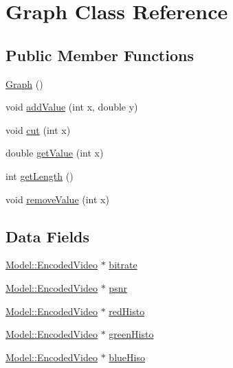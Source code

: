 \hypertarget{classModel_1_1Graph}{}\section{Graph Class Reference}
\label{classModel_1_1Graph}
\subsection*{Public Member Functions}
\begin{DoxyCompactItemize}
\item 
\hyperlink{classModel_1_1Graph_afc5ef9d72cc2c509814200791eaef62c}{Graph} ()
\item 
void \hyperlink{classModel_1_1Graph_ad4f64ac7b49c53bcfe6e62f538381a50}{add\+Value} (int x, double y)
\item 
void \hyperlink{classModel_1_1Graph_a940d481971e87001c6e4c17585b41a8e}{cut} (int x)
\item 
double \hyperlink{classModel_1_1Graph_aacd99feb76afec4bc9bdf645d4585880}{get\+Value} (int x)
\item 
int \hyperlink{classModel_1_1Graph_aab0d4bbd0884d04dbe281cc2b9d21206}{get\+Length} ()
\item 
void \hyperlink{classModel_1_1Graph_a88400b56c971065fc52ce8c02ecaffcd}{remove\+Value} (int x)
\end{DoxyCompactItemize}
\subsection*{Data Fields}
\begin{DoxyCompactItemize}
\item 
\hyperlink{classModel_1_1EncodedVideo}{Model\+::\+Encoded\+Video} $\ast$ \hyperlink{classModel_1_1Graph_a340d02df4a8d3c909b9242c450c2c4fa}{bitrate}
\item 
\hyperlink{classModel_1_1EncodedVideo}{Model\+::\+Encoded\+Video} $\ast$ \hyperlink{classModel_1_1Graph_a6476f7924ca1e0e066bbb0da6f5ea5de}{psnr}
\item 
\hyperlink{classModel_1_1EncodedVideo}{Model\+::\+Encoded\+Video} $\ast$ \hyperlink{classModel_1_1Graph_a826dee34980905d4300038e1ebc8efaf}{red\+Histo}
\item 
\hyperlink{classModel_1_1EncodedVideo}{Model\+::\+Encoded\+Video} $\ast$ \hyperlink{classModel_1_1Graph_adb7c23252690d5783f98e23046f785e8}{green\+Histo}
\item 
\hyperlink{classModel_1_1EncodedVideo}{Model\+::\+Encoded\+Video} $\ast$ \hyperlink{classModel_1_1Graph_a478d40084049d5801d2c7c70a4447133}{blue\+Hiso}
\end{DoxyCompactItemize}
